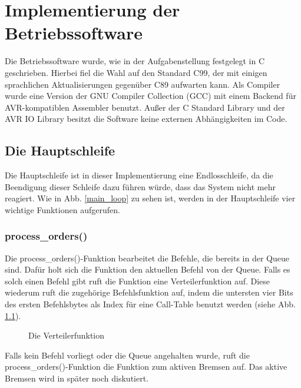\chapter{Implementierung der Betriebssoftware}
Die Betriebssoftware wurde, wie in der Aufgabenstellung festgelegt in C geschrieben.
Hierbei fiel die Wahl auf den Standard C99, der mit einigen sprachlichen
Aktualisierungen gegenüber C89 aufwarten kann. Als Compiler wurde eine Version der
GNU Compiler Collection (GCC) mit einem Backend für AVR-kompatiblen Assembler benutzt.
Außer der C Standard Library und der AVR IO Library besitzt die Software keine externen
Abhängigkeiten im Code.
\section{Die Hauptschleife}
Die Hauptschleife ist in dieser Implementierung eine Endlosschleife, da die Beendigung dieser
Schleife dazu führen würde, dass das System nicht mehr reagiert.
Wie in Abb. \ref{main_loop} zu sehen ist, werden in der Hauptschleife vier wichtige Funktionen
aufgerufen.
\subsection{process\_orders()}
Die process\_\-orders()\--Funktion bearbeitet die Befehle, die bereits in der Queue sind. Dafür holt
sich die Funktion den aktuellen Befehl von der Queue. Falls es solch einen Befehl gibt ruft die
Funktion eine Verteilerfunktion auf. Diese wiederum ruft die zugehörige Befehlsfunktion auf, indem
die untersten vier Bits des ersten Befehlsbytes als Index für eine Call-Table benutzt werden (siehe
Abb. \ref{dispatch_function}).\\
\begin{figure}[htb]
 \centering
 \caption{\label{dispatch_function}Die Verteilerfunktion}
\end{figure}
Falls kein Befehl vorliegt oder die Queue angehalten wurde, ruft die process\_\-orders()-Funktion die
Funktion zum aktiven Bremsen auf. Das aktive Bremsen wird in später noch diskutiert.
